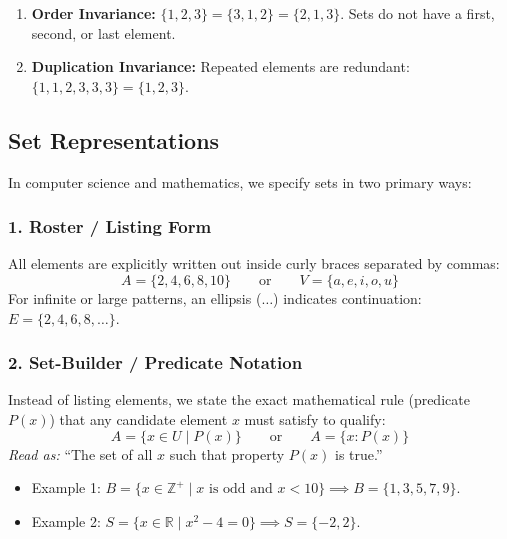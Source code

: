 \documentclass[11pt,a4paper]{article}
\begin{document}
\begin{notebox}
\begin{enumerate}
    \item \textbf{Order Invariance:} $\{1, 2, 3\} = \{3, 1, 2\} = \{2, 1, 3\}$. Sets do not have a first, second, or last element.
    \item \textbf{Duplication Invariance:} Repeated elements are redundant: $\{1, 1, 2, 3, 3, 3\} = \{1, 2, 3\}$.
\end{enumerate}
\end{notebox}

\subsection{Set Representations}
In computer science and mathematics, we specify sets in two primary ways:

\subsubsection{1. Roster / Listing Form}
All elements are explicitly written out inside curly braces separated by commas:
\[
A = \{2, 4, 6, 8, 10\} \qquad \text{or} \qquad V = \{a, e, i, o, u\}
\]
For infinite or large patterns, an ellipsis ($\dots$) indicates continuation: $E = \{2, 4, 6, 8, \dots\}$.

\subsubsection{2. Set-Builder / Predicate Notation}
Instead of listing elements, we state the exact mathematical rule (predicate $P(x)$) that any candidate element $x$ must satisfy to qualify:
\[
A = \{ x \in U \mid P(x) \} \qquad \text{or} \qquad A = \{ x : P(x) \}
\]
\textit{Read as:} ``The set of all $x$ such that property $P(x)$ is true.''
\begin{itemize}
    \item Example 1: $B = \{x \in \mathbb{Z}^+ \mid x \text{ is odd and } x < 10\} \implies B = \{1, 3, 5, 7, 9\}$.
    \item Example 2: $S = \{x \in \mathbb{R} \mid x^2 - 4 = 0\} \implies S = \{-2, 2\}$.
\end{itemize}
\end{document}
